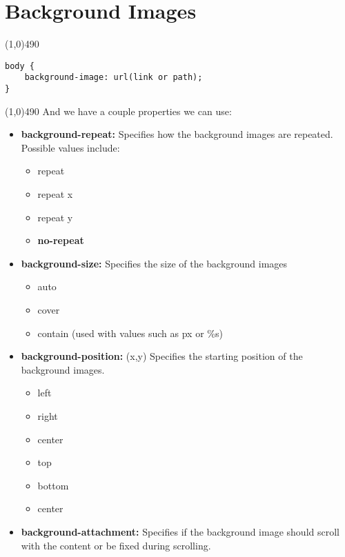 \documentclass{report}
\begin{document}
    \section{\LARGE Background Images}
    \bigbreak \noindent 
    \bigbreak \noindent 
    \line(1,0){490}
    \begin{verbatim}
body {
    background-image: url(link or path);
}
    \end{verbatim}
    \line(1,0){490}
    \bigbreak \noindent 
    And we have a couple properties we can use:
    \bigbreak \noindent 
    \begin{itemize}
        \item \textbf{background-repeat:}  Specifies how the background images are repeated. Possible values include:
            \begin{itemize}
                \item repeat
                \item repeat x
                \item repeat y
                \item \textbf{no-repeat}
            \end{itemize}
        \item \textbf{background-size:} Specifies the size of the background images
            \begin{itemize}
                \item auto
                \item cover
                \item contain (used with values such as px or \%s)
            \end{itemize}
        \item \textbf{background-position:} (x,y) Specifies the starting position of the background images.
            \begin{itemize}
                \item left 
                \item right
                \item center
                \item top
                \item bottom
                \item center
            \end{itemize}
        \item \textbf{background-attachment:} Specifies if the background image should scroll with the content or be fixed during scrolling.
            \begin{itemize}

\end{itemize}
\end{itemize}
\end{document}
